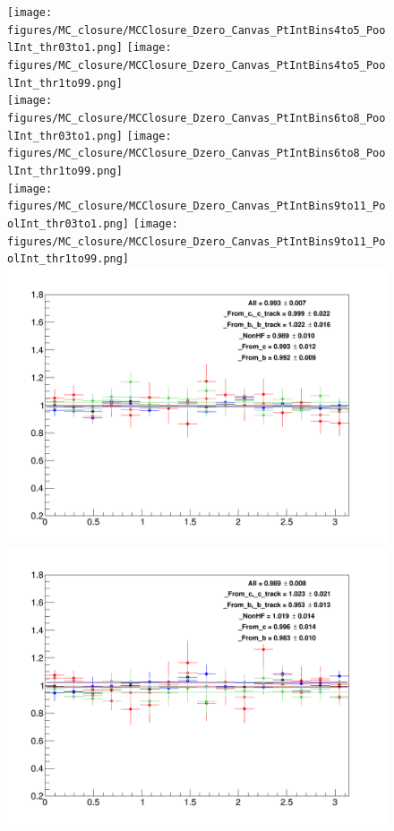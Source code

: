 \begin{figure}
\centering
{\texttt{[image: figures/MC\_closure/MCClosure\_Dzero\_Canvas\_PtIntBins4to5\_PoolInt\_thr03to1.png]}}
{\texttt{[image: figures/MC\_closure/MCClosure\_Dzero\_Canvas\_PtIntBins4to5\_PoolInt\_thr1to99.png]}} \\

{\texttt{[image: figures/MC\_closure/MCClosure\_Dzero\_Canvas\_PtIntBins6to8\_PoolInt\_thr03to1.png]}}
{\texttt{[image: figures/MC\_closure/MCClosure\_Dzero\_Canvas\_PtIntBins6to8\_PoolInt\_thr1to99.png]}} \\

{\texttt{[image: figures/MC\_closure/MCClosure\_Dzero\_Canvas\_PtIntBins9to11\_PoolInt\_thr03to1.png]}}
{\texttt{[image: figures/MC\_closure/MCClosure\_Dzero\_Canvas\_PtIntBins9to11\_PoolInt\_thr1to99.png]}} \\

{\includegraphics[width=.48\linewidth]{figures/MC_closure/MCClosure_Dzero_Canvas_PtIntBins12to13_PoolInt_thr03to1.png}}
{\includegraphics[width=.48\linewidth]{figures/MC_closure/MCClosure_Dzero_Canvas_PtIntBins12to13_PoolInt_thr1to99.png}}
\end{figure}
